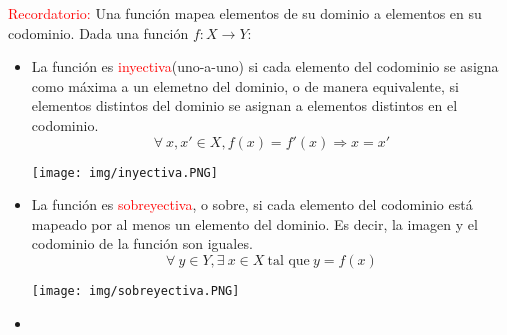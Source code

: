 \documentclass[../main]{subfiles}
\begin{document}

\textcolor{red}{Recordatorio:} Una función mapea elementos de su dominio a elementos en su codominio. Dada una función $f: X\rightarrow Y$:
\begin{itemize}
    \item 
    \begin{minipage}{0.5\textwidth}
        La función es \textcolor{red}{inyectiva}(uno-a-uno) si cada elemento del codominio se asigna como máxima a un elemetno del dominio, o de manera equivalente, si elementos distintos del dominio se asignan a elementos distintos en el codominio.
        \begin{equation}
            \forall \ x,x' \in X, f(x)=f'(x) \Rightarrow x=x'
        \end{equation}    
    \end{minipage}
    \begin{minipage}{0.5\textwidth}
        \begin{center}
            \texttt{[image: img/inyectiva.PNG]}
        \end{center}
    \end{minipage}
    \item 
    \begin{minipage}{0.5\textwidth}
        La función es \textcolor{red}{sobreyectiva}, o sobre, si cada elemento del codominio está mapeado por al menos un elemento del dominio. Es decir, la imagen y el codominio de la función son iguales.
        \begin{equation}
            \forall \ y \in Y, \exists \ x \in X \ \text{tal que} \ y=f(x)
        \end{equation}   
    \end{minipage}
    \begin{minipage}{0.5\textwidth}
        \begin{center}
            \texttt{[image: img/sobreyectiva.PNG]}
        \end{center}
    \end{minipage}
    \item 

\end{itemize}
\end{document}
